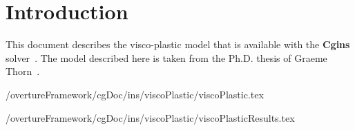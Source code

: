 \documentclass[11pt]{article}
\newcommand{\vpDir}{\homeHenshaw/overtureFramework/cgDoc/ins/viscoPlastic}
\begin{document}
\tableofcontents

\vfill\eject


\section{Introduction}

This document describes the visco-plastic model that is available with the {\bf Cgins} solver~\cite{CginsUserGuide}.
The model described here is taken from the Ph.D. thesis of Graeme Thorn~\cite{Thorn2004}.

 \vpDir/viscoPlastic.tex







 \vpDir/viscoPlasticResults.tex


\vfill\eject


\end{document}
